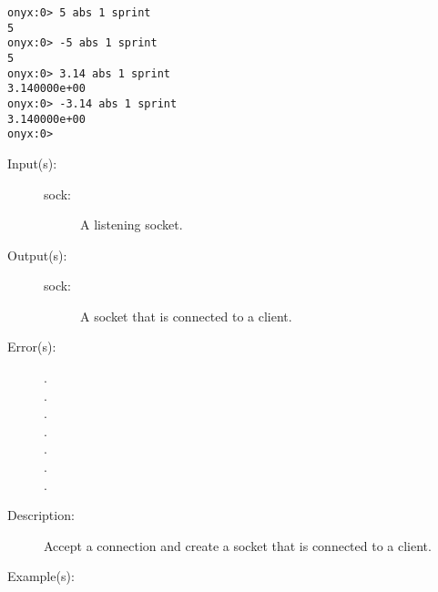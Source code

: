 \begin{description}
\begin{description}
\begin{verbatim}
onyx:0> 5 abs 1 sprint
5
onyx:0> -5 abs 1 sprint
5
onyx:0> 3.14 abs 1 sprint
3.140000e+00
onyx:0> -3.14 abs 1 sprint
3.140000e+00
onyx:0>
		\end{verbatim}
	\end{description}
\label{systemdict:accept}
\item[{\onyxop{sock}{accept}{sock}}: ]
	\begin{description}\item[]
	\item[Input(s): ]
		\begin{description}\item[]
		\item[sock: ]
			A listening socket.
		\end{description}
	\item[Output(s): ]
		\begin{description}\item[]
		\item[sock: ]
			A socket that is connected to a client.
		\end{description}
	\item[Error(s): ]
		\begin{description}\item[]
		\item[.]
		\item[.]
		\item[.]
		\item[.]
		\item[.]
		\item[.]
		\item[.]
		\end{description}
	\item[Description: ]
		Accept a connection and create a socket that is connected to a
		client.
	\item[Example(s): ]\begin{verbatim}


\end{verbatim}
\end{description}
\end{description}

